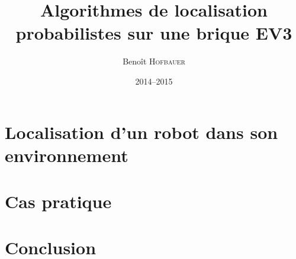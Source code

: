 \documentclass[12pt,a4paper]{./../../template/memoire-umons}
\title{Algorithmes de localisation probabilistes sur une brique EV3}
\author{Beno\^it \textsc{Hofbauer}}
\date{2014--2015}
\begin{document}
\begin{preface}

\end{preface}


\tableofcontents
\listoffigures

%
\part{Localisation d'un robot dans son environnement }





\part{Cas pratique }



\part{Conclusion}





\end{document}
